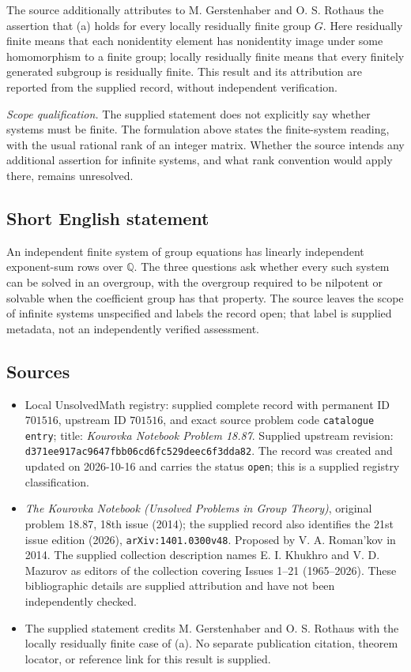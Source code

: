\documentclass[11pt]{article}
\newcommand{\Q}{\mathbb{Q}}
\begin{document}
The source additionally attributes to M. Gerstenhaber and O. S. Rothaus the assertion that (a) holds for every locally residually finite group \(G\). Here residually finite means that each nonidentity element has nonidentity image under some homomorphism to a finite group; locally residually finite means that every finitely generated subgroup is residually finite. This result and its attribution are reported from the supplied record, without independent verification.

\emph{Scope qualification.} The supplied statement does not explicitly say whether systems must be finite. The formulation above states the finite-system reading, with the usual rational rank of an integer matrix. Whether the source intends any additional assertion for infinite systems, and what rank convention would apply there, remains unresolved.
\subsection{Short English statement}
An independent finite system of group equations has linearly independent exponent-sum rows over \(\Q\). The three questions ask whether every such system can be solved in an overgroup, with the overgroup required to be nilpotent or solvable when the coefficient group has that property. The source leaves the scope of infinite systems unspecified and labels the record open; that label is supplied metadata, not an independently verified assessment.
\subsection{Sources}
\begin{itemize}
\item Local UnsolvedMath registry: supplied complete record with permanent ID \(701516\), upstream ID \(701516\), and exact source problem code \texttt{catalogue entry}; title: \emph{Kourovka Notebook Problem 18.87}. Supplied upstream revision: \texttt{d371ee917ac9647fbb06cd6fc529deec6f3dda82}. The record was created and updated on 2026-10-16 and carries the status \texttt{open}; this is a supplied registry classification.
\item \emph{The Kourovka Notebook (Unsolved Problems in Group Theory)}, original problem 18.87, 18th issue (2014); the supplied record also identifies the 21st issue edition (2026), \texttt{arXiv:1401.0300v48}. Proposed by V. A. Roman'kov in 2014. The supplied collection description names E. I. Khukhro and V. D. Mazurov as editors of the collection covering Issues 1--21 (1965--2026). These bibliographic details are supplied attribution and have not been independently checked.
\item The supplied statement credits M. Gerstenhaber and O. S. Rothaus with the locally residually finite case of (a). No separate publication citation, theorem locator, or reference link for this result is supplied.
\end{itemize}
\end{document}
